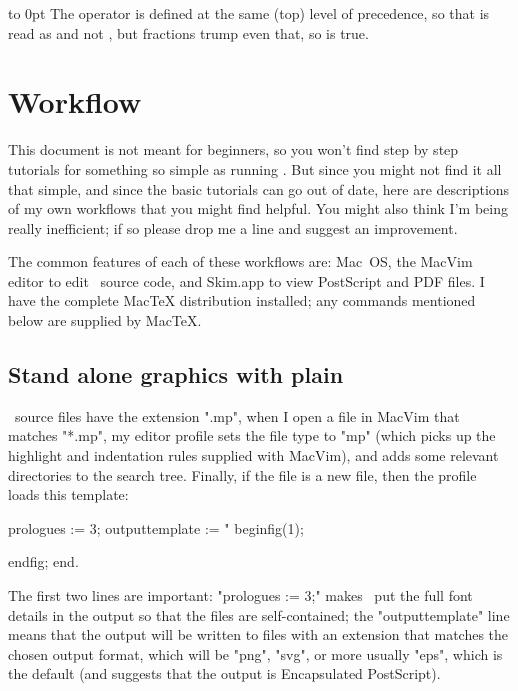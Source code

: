 \documentclass[a4paper,landscape]{article}
\begin{document}
\vskip -22pt
\vbox to 0pt{\vss\hsize 4in\noindent
The  operator is defined at the same (top) level of precedence, so
that  is read as  and not , but fractions
trump even that, so  is true.}

\newpage
\section{Workflow}

This document is not meant for beginners, so you won't find step by step tutorials
for something so simple as running \MP.  But since you might not find it all that
simple, and since the basic tutorials can go out of date, here are descriptions of
my own workflows that you might find helpful.  You might also think I'm being really
inefficient; if so please drop me a line and suggest an improvement.

The common features of each of these workflows are: Mac~OS, the MacVim editor to
edit \MP\ source code, and
Skim.app to view PostScript and PDF files.  I have the complete MacTeX distribution
installed; any commands mentioned below are supplied by MacTeX.

\subsection{Stand alone graphics with plain \MP}\label{sec:plain-flow}

\MP\ source files have the extension ".mp", when I open a file in MacVim that
matches "*.mp", my editor profile sets the file type to "mp" (which picks up the
highlight and indentation rules supplied with MacVim), and adds some relevant
directories to the search tree.  Finally, if the file is a new file, then the
profile loads this template:
\begin{smallcode}
prologues := 3;
outputtemplate := "%
beginfig(1);

endfig;
end.
\end{smallcode}
The first two lines are important: "prologues := 3;" makes \MP\ put the full font
details in the output so that the files are self-contained; the "outputtemplate"
line means that the output will be written to files with an extension that matches
the chosen output format, which will be "png", "svg", or more usually "eps", which
is the default (and suggests that the output is Encapsulated PostScript).

\smallskip
\end{document}
